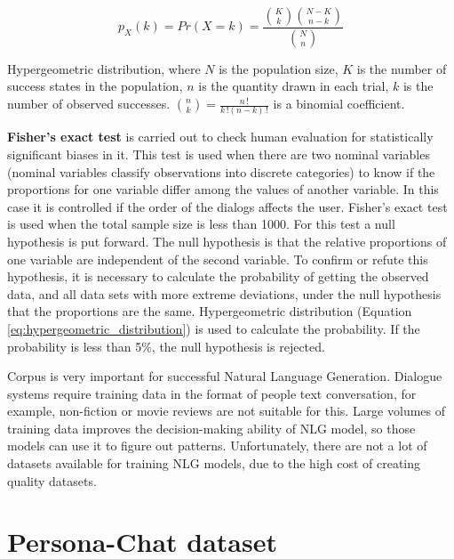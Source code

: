 \begin{eqfloat}
\begin{equation} \label{eq:hypergeometric_distribution}
p_X(k) = Pr(X=k) = \frac{\binom{K}{k} \binom{N-K}{n-k}}{\binom{N}{n}}
\end{equation}
\caption{Hypergeometric distribution, where $N$ is the population size, $K$ is the number of success states in the population, $n$ is the quantity drawn in each trial, $k$ is the number of observed successes. $\binom{n}{k} = \frac{n\,!}{k\,!(n-k)\,!}$ is a binomial coefficient.}
\end{eqfloat}

\textbf{Fisher's exact test} \cite{fisher1922interpretation} is carried out to check human evaluation for statistically significant biases in it. This test is used when there are two nominal variables (nominal variables classify observations into discrete categories) to know if the proportions for one variable differ among the values of another variable. In this case it is controlled if the order of the dialogs affects the user. 
Fisher's exact test is used when the total sample size is less than 1000. For this test a null hypothesis is put forward. The null hypothesis is that the relative proportions of one variable are independent of the second variable. To confirm or refute this hypothesis, it is necessary to calculate the probability of getting the observed data, and all data sets with more extreme deviations, under the null hypothesis that the proportions are the same. Hypergeometric distribution (Equation \ref{eq:hypergeometric_distribution}) is used to calculate the probability. If the probability is less than 5\%, the null hypothesis is rejected. 

Corpus is very important for successful Natural Language Generation. Dialogue systems require training data in the format of people text conversation, for example, non-fiction or movie reviews are not suitable for this. Large volumes of training data improves the decision-making ability of NLG model, so those models can use it to figure out patterns. Unfortunately, there are not a lot of datasets available for training NLG models, due to the high cost of creating quality datasets.  

\section{Persona-Chat dataset} \label{persona_chat_subsec}

